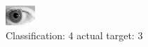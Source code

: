 \begin{figure}[h!]
\begin{center}
\includegraphics[width=0.60\columnwidth]{figures/ID211_class_4_target_3.png}
\end{center}
\caption{ Classification: 4 actual target: 3}
\label{fig:ID211_class_4_target_3}
\end{figure}
